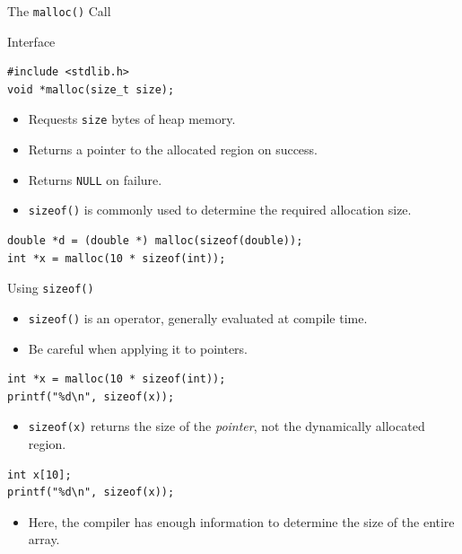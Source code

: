 \begin{frame}[fragile]{The \texttt{malloc()} Call}
    \begin{block}{Interface}
\begin{verbatim}
#include <stdlib.h>
void *malloc(size_t size);
\end{verbatim}
    \end{block}

    \begin{itemize}
        \item Requests \texttt{size} bytes of heap memory.
        \item Returns a pointer to the allocated region on success.
        \item Returns \texttt{NULL} on failure.
        \item \texttt{sizeof()} is commonly used to determine
              the required allocation size.
    \end{itemize}

\begin{verbatim}
double *d = (double *) malloc(sizeof(double));
int *x = malloc(10 * sizeof(int));
\end{verbatim}
\end{frame}


\begin{frame}[fragile]{Using \texttt{sizeof()}}
    \begin{itemize}
        \item \texttt{sizeof()} is an operator, generally evaluated
              at compile time.
        \item Be careful when applying it to pointers.
    \end{itemize}

\begin{verbatim}
int *x = malloc(10 * sizeof(int));
printf("%d\n", sizeof(x));
\end{verbatim}

    \begin{itemize}
        \item \texttt{sizeof(x)} returns the size of the
              \emph{pointer}, not the dynamically allocated region.
    \end{itemize}

\begin{verbatim}
int x[10];
printf("%d\n", sizeof(x));
\end{verbatim}

    \begin{itemize}
        \item Here, the compiler has enough information to determine
              the size of the entire array.
    \end{itemize}
\end{frame}


